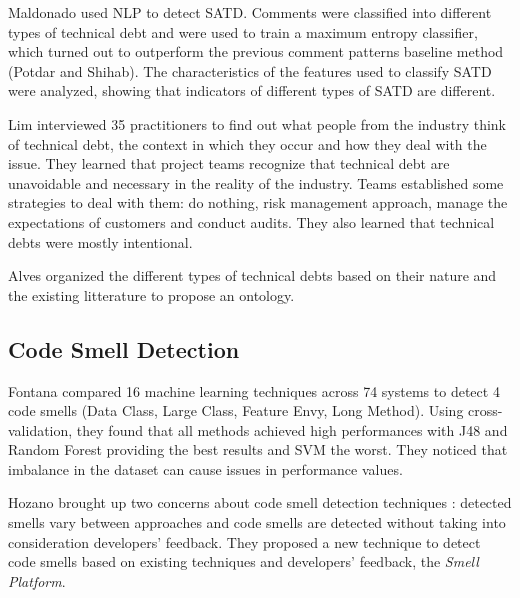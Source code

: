 Maldonado \etal \cite{maldonado2017using} used NLP to detect SATD. Comments were classified into different types of technical debt and were used to train a maximum entropy classifier, which turned out to outperform the previous comment patterns baseline method (Potdar and Shihab). The characteristics of the features used to classify SATD were analyzed, showing that indicators of different types of SATD are different.

Lim \etal \cite{lim2012balancing} interviewed 35 practitioners to find out what people from the industry think of technical debt, the context in which they occur and how they deal with the issue. They learned that project teams recognize that technical debt are unavoidable and necessary in the reality of the industry. Teams established some strategies to deal with them: do nothing, risk management approach, manage the expectations of customers and conduct audits. They also learned that technical debts were mostly intentional.

Alves \etal \cite{alves2014towards} organized the different types of technical debts based on their nature and the existing litterature to propose an ontology.

\subsection{Code Smell Detection}

Fontana \etal \cite{fontana2016comparing} compared 16 machine learning techniques across 74 systems to detect 4 code smells (Data Class, Large Class, Feature Envy, Long Method). Using cross-validation, they found that all methods achieved high performances with J48 and Random Forest providing the best results and SVM the worst. They noticed that imbalance in the dataset can cause issues in performance values.

Hozano \etal \cite{hozano2015using} brought up two concerns about code smell detection techniques : detected smells vary between approaches and code smells are detected without taking into consideration developers' feedback. They proposed a new technique to detect code smells based on existing techniques and developers' feedback, the \textit{Smell Platform}.

